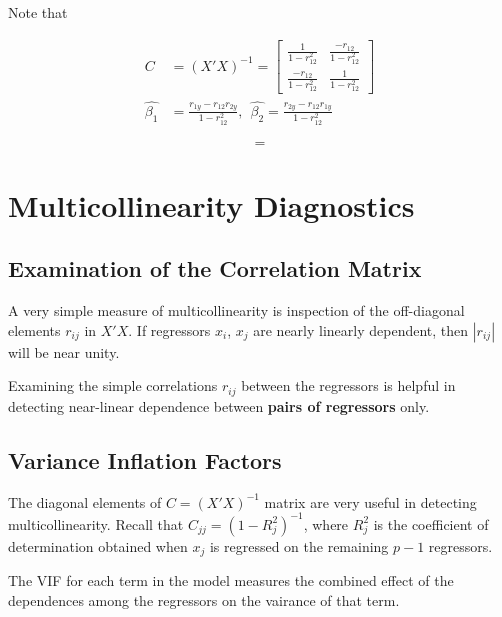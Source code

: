 \documentclass[12pt]{article}
\begin{document}
Note that 

$$
\begin{aligned}
C &= (X'X)^{-1} = \begin{bmatrix} \frac{1}{1-r_{12}^2} & \frac{-r_{12}}{1-r_{12}^2} \\
 \frac{-r_{12}}{1-r_{12}^2} & \frac{1}{1-r_{12}^2}  \end{bmatrix} \\[10pt] 
 \hat{\beta_1} &= \frac{r_{1y} - r_{12} r_{2y} }{ 1 - r_{12}^2}, \ \ \hat{\beta_2} = \frac{r_{2y} - r_{12} r_{1y} }{ 1 - r_{12}^2}
\end{aligned}
$$





$$
 = 
$$




\section{Multicollinearity Diagnostics}


\subsection{Examination of the Correlation Matrix}

A very simple measure of multicollinearity is inspection of the off-diagonal elements $r_{ij}$ in $X'X$. If regressors $x_i$, $x_j$ are nearly linearly dependent, then $|r_{ij}|$ will be near unity. 




Examining the simple correlations $r_{ij}$ between the regressors is helpful in detecting near-linear dependence between \textbf{pairs of regressors} only. 


\subsection{Variance Inflation Factors}

The diagonal elements of $C = (X'X)^{-1}$ matrix are very useful in detecting multicollinearity. Recall that $C_{jj} = (1 - R_j^2)^{-1}$, where $R_j^2$ is the coefficient of determination obtained when $x_j$ is regressed on the remaining $p-1$ regressors. 


The VIF for each term in the model measures the combined effect of the dependences among the regressors on the vairance of that term. 
\end{document}
